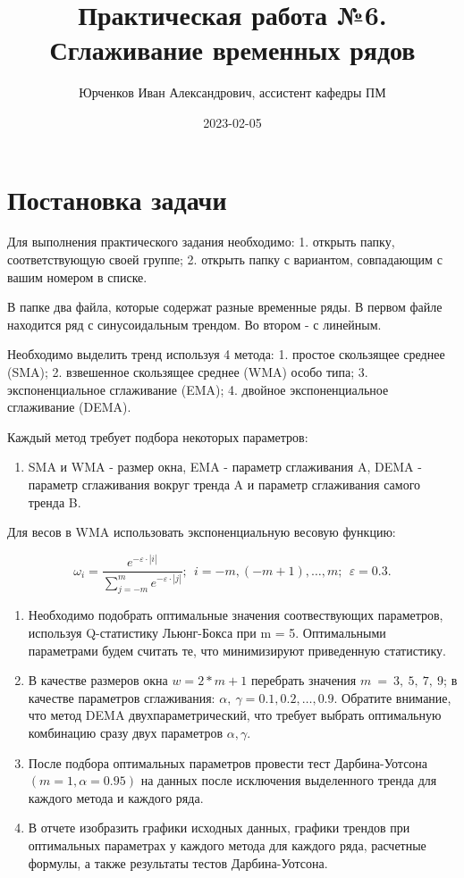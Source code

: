 \documentclass[
]{article}
\title{Практическая работа №6. Сглаживание временных рядов}
\author{Юрченков Иван Александрович, ассистент кафедры ПМ}
\date{2023-02-05}
\providecommand{\tightlist}{%
  \setlength{\itemsep}{0pt}\setlength{\parskip}{0pt}}
\begin{document}
\maketitle

\hypertarget{ux43fux43eux441ux442ux430ux43dux43eux432ux43aux430-ux437ux430ux434ux430ux447ux438}{%
\section{\texorpdfstring{\textbf{Постановка
задачи}}{Постановка задачи}}\label{ux43fux43eux441ux442ux430ux43dux43eux432ux43aux430-ux437ux430ux434ux430ux447ux438}}

Для выполнения практического задания необходимо: 1. открыть папку,
соответствующую своей группе; 2. открыть папку с вариантом, совпадающим
с вашим номером в списке.

В папке два файла, которые содержат разные временные ряды. В первом
файле находится ряд с синусоидальным трендом. Во втором - с линейным.

Необходимо выделить тренд используя 4 метода: 1. простое скользящее
среднее (SMA); 2. взвешенное скользящее среднее (WMA) особо типа; 3.
экспоненциальное сглаживание (EMA); 4. двойное экспоненциальное
сглаживание (DEMA).

Каждый метод требует подбора некоторых параметров:

\begin{enumerate}
\def\labelenumi{\arabic{enumi}.}
\tightlist
\item
  SMA и WMA - размер окна, EMA - параметр сглаживания A, DEMA - параметр
  сглаживания вокруг тренда A и параметр сглаживания самого тренда B.
\end{enumerate}

Для весов в WMA использовать экспоненциальную весовую функцию:

\[
\omega_i = \frac{e ^{-\varepsilon \cdot |i|}}{\sum\limits_{j=-m}^{m} e ^{-\varepsilon \cdot |j|}};\ \ i = -m, (-m+1), \dots, m;\ \ \varepsilon = 0.3.
\]

\begin{enumerate}
\def\labelenumi{\arabic{enumi}.}
\setcounter{enumi}{1}
\item
  Необходимо подобрать оптимальные значения соотвествующих параметров,
  используя Q-статистику Льюнг-Бокса при m = 5. Оптимальными параметрами
  будем считать те, что минимизируют приведенную статистику.
\item
  В качестве размеров окна \(w = 2 * m + 1\) перебрать значения
  \(m\ =\ 3,\ 5,\ 7,\ 9\); в качестве параметров сглаживания:
  \(\alpha,\ \gamma = 0.1, 0.2, \dots, 0.9\). Обратите внимание, что
  метод DEMA двухпараметрический, что требует выбрать оптимальную
  комбинацию сразу двух параметров \(\alpha, \gamma\).
\item
  После подбора оптимальных параметров провести тест Дарбина-Уотсона
  \((m = 1, \alpha = 0.95)\) на данных после исключения выделенного
  тренда для каждого метода и каждого ряда.
\item
  В отчете изобразить графики исходных данных, графики трендов при
  оптимальных параметрах у каждого метода для каждого ряда, расчетные
  формулы, а также результаты тестов Дарбина-Уотсона.
\end{enumerate}
\end{document}
